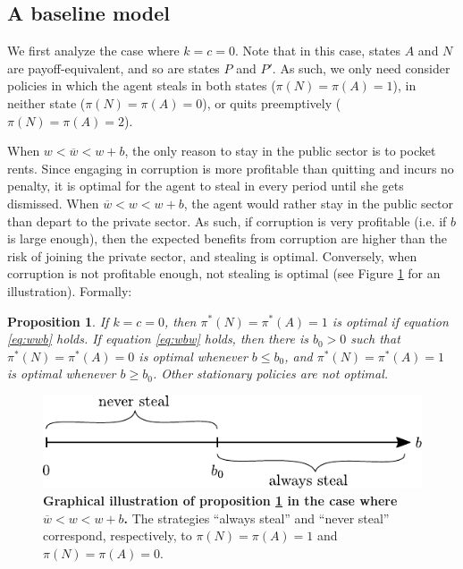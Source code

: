 \documentclass[12pt,a4paper]{article}
\newtheorem{proposition}{Proposition}
\theoremstyle{definition}
\newcommand{\wb}{\overline{w}}
\begin{document}
{\subsection{A baseline model}

We first analyze the case where $k = c = 0$. Note that in this case, states $A$ and $N$ are payoff-equivalent, and so are states $P$ and $P'$. As such, we only need consider policies in which the agent steals in both states ($\pi(N)=\pi(A)=1$), in neither state ($\pi(N)=\pi(A)=0$), or quits preemptively ($\pi(N)=\pi(A)=2$). 

When $w < \wb < w+b$, the only reason to stay in the public sector is to pocket rents. Since engaging in corruption is more profitable than quitting and incurs no penalty, it is optimal for the agent to steal in every period until she gets dismissed. When $\wb < w < w+b$, the agent would rather stay in the public sector than depart to the private sector. As such, if corruption is very profitable (i.e. if $b$ is large enough), then the expected benefits from corruption are higher than the risk of joining the private sector, and stealing is optimal. Conversely, when corruption is not profitable enough, not stealing is optimal (see Figure \ref{fig:eq0} for an illustration). Formally: 

\begin{proposition}
    \label{prop:eq0}
    If $k = c = 0$, then $\pi^*(N)=\pi^*(A)=1$ is optimal if equation \ref{eq:wwb} holds. If equation \ref{eq:wbw} holds, then there is $b_0 > 0$ such that $\pi^*(N)=\pi^*(A)=0$ is optimal whenever $b \leq b_0$, and $\pi^*(N)=\pi^*(A)=1$ is optimal whenever $b \geq b_0$. Other stationary policies are not optimal. 
\end{proposition}

\begin{figure}[H]
    \centering
    \includegraphics{figures_theory/eq_baseline.pdf}
    \caption{{\bf Graphical illustration of proposition \ref{prop:eq0} in the case where $\wb < w < w+b$.} The strategies ``always steal'' and ``never steal'' correspond, respectively, to $\pi(N) = \pi(A) = 1$ and $\pi(N) = \pi(A) = 0$.}
    \label{fig:eq0}
\end{figure}

}
\end{document}
